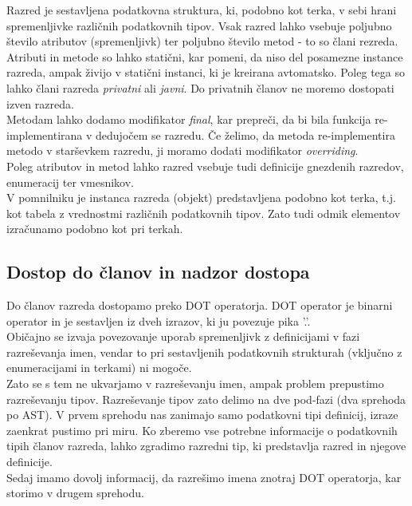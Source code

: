 \documentclass[a4paper, 12p]{book}
\begin{document}
Razred je sestavljena podatkovna struktura, ki, podobno kot terka, v sebi hrani spremenljivke različnih podatkovnih tipov. Vsak razred lahko vsebuje poljubno število atributov (spremenljivk) ter poljubno število metod - to so člani rezreda. \\
\indent Atributi in metode so lahko statični, kar pomeni, da niso del posamezne instance razreda, ampak živijo v statični instanci, ki je kreirana avtomatsko. Poleg tega so lahko člani razreda \textit{privatni} ali \textit{javni}. Do privatnih članov ne moremo dostopati izven razreda. \\
\indent Metodam lahko dodamo modifikator \textit{final}, kar prepreči, da bi bila funkcija re-implementirana v dedujočem se razredu. Če želimo, da metoda re-implementira metodo v starševkem razredu, ji moramo dodati modifikator \textit{overriding}. \\
\indent Poleg atributov in metod lahko razred vsebuje tudi definicije gnezdenih razredov, enumeracij ter vmesnikov.\\
\indent V pomnilniku je instanca razreda (objekt) predstavljena podobno kot terka, t.j. kot tabela z vrednostmi različnih podatkovnih tipov. Zato tudi odmik elementov izračunamo podobno kot pri terkah.

\subsection{Dostop do članov in nadzor dostopa}

Do članov razreda dostopamo preko DOT operatorja. DOT operator je binarni operator in je sestavljen iz dveh izrazov, ki ju povezuje pika '.'. \\
\indent Običajno se izvaja povezovanje uporab spremenljivk z definicijami v fazi razreševanja imen, vendar to pri sestavljenih podatkovnih strukturah (vključno z enumeracijami in terkami) ni mogoče.\\
\indent Zato se s tem ne ukvarjamo v razreševanju imen, ampak problem prepustimo razreševanju tipov. Razreševanje tipov zato delimo na dve pod-fazi (dva sprehoda po AST). V prvem sprehodu nas zanimajo samo podatkovni tipi definicij, izraze zaenkrat pustimo pri miru. Ko zberemo vse potrebne informacije o podatkovnih tipih članov razreda, lahko zgradimo razredni tip, ki predstavlja razred in njegove definicije. \\
\indent Sedaj imamo dovolj informacij, da razrešimo imena znotraj DOT operatorja, kar storimo v drugem sprehodu.\\
\end{document}
